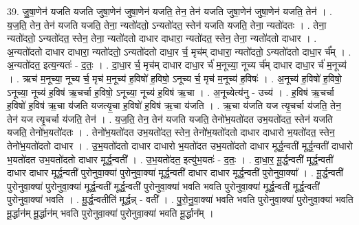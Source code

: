 \documentclass[17pt]{extarticle}
\begin{document}
39. जु॒षा॒णेन॑ यजति यजति जुषा॒णेन॑ जुषा॒णेन॑ यजति॒ तेन॒ तेन॑ यजति जुषा॒णेन॑ जुषा॒णेन॑ यजति॒ तेन॑ । . य॒ज॒ति॒ तेन॒ तेन॑ यजति यजति॒ तेना॒ न्यतो॑दतो॒ ऽन्यतो॑दत॒ स्तेन॑ यजति यजति॒ तेना॒ न्यतो॑दतः । . तेना॒ न्यतो॑दतो॒ ऽन्यतो॑दत॒ स्तेन॒ तेना॒ न्यतो॑दतो दाधार दाधारा॒ न्यतो॑दत॒ स्तेन॒ तेना॒ न्यतो॑दतो दाधार । . अ॒न्यतो॑दतो दाधार दाधारा॒ न्यतो॑दतो॒ ऽन्यतो॑दतो दाधा॒र र्च॒ मृच॑म् दाधारा॒ न्यतो॑दतो॒ ऽन्यतो॑दतो दाधा॒र र्च᳚म् । . अ॒न्यतो॑दत॒ इत्य॒न्यतः॑ - द॒तः॒ । . दा॒धा॒र र्च॒ मृच॑म् दाधार दाधा॒र र्च॑ म॒नूच्या॒ नूच्य र्च॑म् दाधार दाधा॒र र्च॑ म॒नूच्य॑ । . ऋच॑ म॒नूच्या॒ नूच्य र्च॒ मृच॑ म॒नूच्य॑ ह॒विषो॑ ह॒विषो॒ ऽनूच्य र्च॒ मृच॑ म॒नूच्य॑ ह॒विषः॑ । . अ॒नूच्य॑ ह॒विषो॑ ह॒विषो॒ ऽनूच्या॒ नूच्य॑ ह॒विष॑ ऋ॒चर्चा ह॒विषो॒ ऽनूच्या॒ नूच्य॑ ह॒विष॑ ऋ॒चा । . अ॒नूच्येत्य॑नु - उच्य॑ । . ह॒विष॑ ऋ॒चर्चा ह॒विषो॑ ह॒विष॑ ऋ॒चा य॑जति यजत्यृ॒चा ह॒विषो॑ ह॒विष॑ ऋ॒चा य॑जति । . ऋ॒चा य॑जति यज त्यृ॒चर्चा य॑जति॒ तेन॒ तेन॑ यज त्यृ॒चर्चा य॑जति॒ तेन॑ । . य॒ज॒ति॒ तेन॒ तेन॑ यजति यजति॒ तेनो॑भ॒यतो॑दत उभ॒यतो॑दत॒ स्तेन॑ यजति यजति॒ तेनो॑भ॒यतो॑दतः । . तेनो॑भ॒यतो॑दत उभ॒यतो॑दत॒ स्तेन॒ तेनो॑भ॒यतो॑दतो दाधार दाधारो भ॒यतो॑दत॒ स्तेन॒ तेनो॑भ॒यतो॑दतो दाधार । . उ॒भ॒यतो॑दतो दाधार दाधारो भ॒यतो॑दत उभ॒यतो॑दतो दाधार मूर्द्ध॒न्वती॑ मूर्द्ध॒न्वती॑ दाधारो भ॒यतो॑दत उभ॒यतो॑दतो दाधार मूर्द्ध॒न्वती᳚ । . उ॒भ॒यतो॑दत॒ इत्यु॑भ॒यतः॑ - द॒तः॒ । . दा॒धा॒र॒ मू॒र्द्ध॒न्वती॑ मूर्द्ध॒न्वती॑ दाधार दाधार मूर्द्ध॒न्वती॑ पुरोनुवा॒क्या॑ पुरोनुवा॒क्या॑ मूर्द्ध॒न्वती॑ दाधार दाधार मूर्द्ध॒न्वती॑ पुरोनुवा॒क्या᳚ । . मू॒र्द्ध॒न्वती॑ पुरोनुवा॒क्या॑ पुरोनुवा॒क्या॑ मूर्द्ध॒न्वती॑ मूर्द्ध॒न्वती॑ पुरोनुवा॒क्या॑ भवति भवति पुरोनुवा॒क्या॑ मूर्द्ध॒न्वती॑ मूर्द्ध॒न्वती॑ पुरोनुवा॒क्या॑ भवति । . मू॒र्द्ध॒न्वतीति॑ मूर्द्धन्न् - वती᳚ । . पु॒रो॒नु॒वा॒क्या॑ भवति भवति पुरोनुवा॒क्या॑ पुरोनुवा॒क्या॑ भवति मू॒र्द्धान॑म् मू॒र्द्धान॑म् भवति पुरोनुवा॒क्या॑ पुरोनुवा॒क्या॑ भवति मू॒र्द्धान᳚म् । \newline
\end{document}
